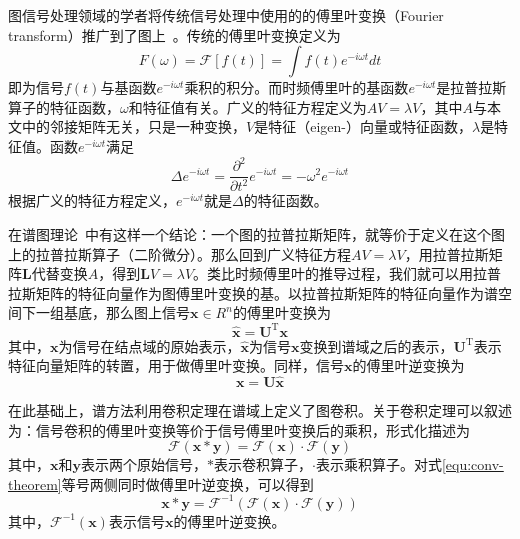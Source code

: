 \documentclass[final]{cvpr}
\begin{document}
图信号处理领域的学者将传统信号处理中使用的的傅里叶变换（Fourier transform）推广到了图上~\cite{shuman2013emerging}。传统的傅里叶变换定义为
\begin{equation}
    F\left( \omega \right) = 
    \mathcal{F}\left[  f\left( t \right) \right] =
    \int f\left( t \right)e^{-i\omega t}dt
\end{equation}
即为信号$f\left( t \right)$与基函数$e^{-i\omega t}$乘积的积分。而时频傅里叶的基函数$e^{-i\omega t}$是拉普拉斯算子的特征函数，$\omega$和特征值有关。广义的特征方程定义为$AV=\lambda V$，其中$A$与本文中的邻接矩阵无关，只是一种变换，$V$是特征（eigen-）向量或特征函数，$\lambda$是特征值。函数$e^{-i\omega t}$满足
\begin{equation}
    \Delta e^{-i\omega t}
    =\frac{\partial ^2}
          {\partial t^2} e^{-i\omega t}
    =-\omega ^2 e^{-i\omega t}
\end{equation}
根据广义的特征方程定义，$e^{-i\omega t}$就是$\Delta$的特征函数。

在谱图理论~\cite{chung1997spectral}中有这样一个结论：一个图的拉普拉斯矩阵，就等价于定义在这个图上的拉普拉斯算子（二阶微分）。那么回到广义特征方程$AV=\lambda V$，用拉普拉斯矩阵$\boldsymbol{L}$代替变换$A$，得到$\boldsymbol{L}V=\lambda V$。类比时频傅里叶的推导过程，我们就可以用拉普拉斯矩阵的特征向量作为图傅里叶变换的基。以拉普拉斯矩阵的特征向量作为谱空间下一组基底，那么图上信号$\boldsymbol{x} \in R^n$的傅里叶变换为
\begin{equation}\label{equ:graph-Fourier-1}
    \hat{\boldsymbol{x}} =
    \boldsymbol{U}^{\mathrm{T}}\boldsymbol{x}
\end{equation}
其中，$\boldsymbol{x}$为信号在结点域的原始表示，$\hat{\boldsymbol{x}}$为信号$\boldsymbol{x}$变换到谱域之后的表示，$\boldsymbol{U}^{\mathrm{T}}$表示特征向量矩阵的转置，用于做傅里叶变换。同样，信号$\boldsymbol{x}$的傅里叶逆变换为
\begin{equation}\label{equ:graph-Fourier-2}
    \boldsymbol{x} =
    \boldsymbol{U}\hat{\boldsymbol{x}}
\end{equation}

在此基础上，谱方法利用卷积定理在谱域上定义了图卷积。关于卷积定理可以叙述为：信号卷积的傅里叶变换等价于信号傅里叶变换后的乘积，形式化描述为
\begin{equation}\label{equ:conv-theorem}
    \mathcal{F} \left( \boldsymbol{x}*\boldsymbol{y} \right)
    =
    \mathcal{F} \left( \boldsymbol{x} \right) \cdot 
    \mathcal{F} \left( \boldsymbol{y} \right)
\end{equation}
其中，$\boldsymbol{x}$和$\boldsymbol{y}$表示两个原始信号，$*$表示卷积算子，$\cdot$表示乘积算子。对式\ref{equ:conv-theorem}等号两侧同时做傅里叶逆变换，可以得到
\begin{equation}\label{equ:conv-theorem-ada}
    \boldsymbol{x}*\boldsymbol{y}
    =
    \mathcal{F}^{-1} \left( \mathcal{F} \left( \boldsymbol{x} \right) \cdot 
    \mathcal{F} \left( \boldsymbol{y} \right) \right)
\end{equation}
其中，$\mathcal{F}^{-1}\left( \boldsymbol{x} \right)$表示信号$\boldsymbol{x}$的傅里叶逆变换。
\end{document}
